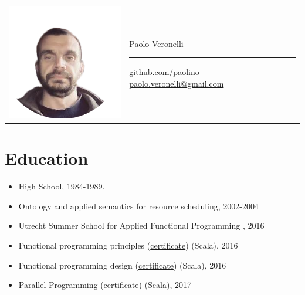 \documentclass[letterpaper,11pt,oneside]{article}
\begin{document}
    \begin{tabular}{m{3.5in} m{3in}}
        \includegraphics[width=2in,left]{photo.png} &
        \vspace{0.5in}

        \begin{flushright}
        {
        \Huge{Paolo Veronelli}  
        \noindent\rule{2.5in}{0.2pt}
        \begin{normalsize}
        \href{https://github.com/paolino}{github.com/paolino}  
        \href{mailto:paolo.veronelli@gmail.com}{paolo.veronelli@gmail.com}
        \end{normalsize}
        }
        \end{flushright}
        \end{tabular}
    \vspace{0.1in}
    \section*{Education}
        \begin{itemize}
            \item High School, 1984-1989.
            \item Ontology and applied semantics for resource scheduling, 2002-2004 
            \item Utrecht Summer School for Applied Functional Programming , 2016
            \item Functional programming principles (\href{https://www.coursera.org/account/accomplishments/certificate/8NVXL4Y3XUB6}{certificate}) (Scala), 2016
            \item Functional programming design (\href{https://www.coursera.org/account/accomplishments/certificate/WTU8B8G54N79}{certificate}) (Scala), 2016
            \item Parallel Programming (\href{https://www.coursera.org/account/accomplishments/certificate/YU7BSRL8VFTT}{certificate}) (Scala), 2017
        \end{itemize}
\end{document}
